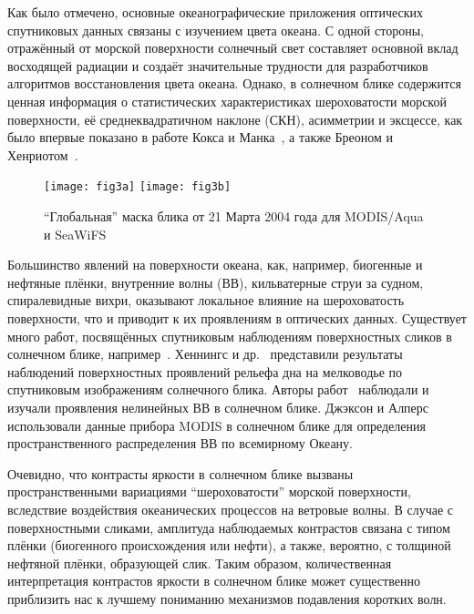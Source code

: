 Как было отмечено, основные океанографические приложения оптических спутниковых данных связаны с изучением цвета океана. С одной стороны, отражённый от морской поверхности солнечный свет составляет основной вклад восходящей радиации и создаёт значительные трудности для разработчиков алгоритмов восстановления цвета океана. Однако, в солнечном блике содержится ценная информация о статистических характеристиках шероховатости морской поверхности, её среднеквадратичном наклоне (СКН), асимметрии и эксцессе, как было впервые показано в работе Кокса и Манка~\citep{Cox1954, Cox1954a}, а также Бреоном и Хенриотом~\citep{Breon2006}.



\begin{figure}[!thb]
	\centering
    \subcaptionbox{\label{fig:3a}}
    {\texttt{[image: fig3a]}}
    \subcaptionbox{\label{fig:3b}}
    {\texttt{[image: fig3b]}}
    \\
    \caption{``Глобальная'' маска блика от 21 Марта 2004 года для MODIS/Aqua и SeaWiFS}
    \label{fig:3}
\end{figure}

Большинство явлений на поверхности океана, как, например, биогенные и нефтяные плёнки, внутренние волны (ВВ), кильватерные струи за судном, спиралевидные вихри, оказывают локальное влияние на шероховатость поверхности, что и приводит к их проявлениям в оптических данных. Существует много работ, посвящённых спутниковым наблюдениям поверхностных сликов в солнечном блике, например~\citep{Adamo2005, Chust2007, Hu2009}. Хеннингс и др.~\citep{Hennings1994} представили результаты наблюдений поверхностных проявлений рельефа дна на мелководье по спутниковым изображениям солнечного блика. Авторы работ~\citep{Apel1975, Artale1990, Mitnik2000} наблюдали и изучали проявления нелинейных ВВ в солнечном блике. Джэксон и Алперс~\citep{Jackson2010} использовали данные прибора MODIS в солнечном блике для определения пространственного распределения ВВ по всемирному Океану.

Очевидно, что контрасты яркости в солнечном блике вызваны пространственными вариациями ``шероховатости'' морской поверхности, вследствие воздействия океанических процессов на ветровые волны. В случае с поверхностными сликами, амплитуда наблюдаемых контрастов связана с типом плёнки (биогенного происхождения или нефти), а также, вероятно, с толщиной нефтяной плёнки, образующей слик. Таким образом, количественная интерпретация контрастов яркости в солнечном блике может существенно приблизить нас к лучшему пониманию механизмов подавления коротких волн.

